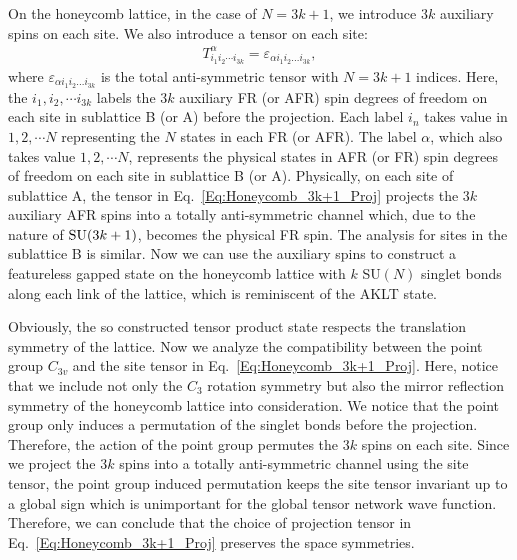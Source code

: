 \documentclass[aps,prb,twocolumn,superscriptaddress,showpacs]{revtex4}
\newcommand{\SU}{\mathrm{SU}}
\newcommand{\beqn}{\begin{eqnarray}}
\newcommand{\eeqn}{\end{eqnarray}}
\def\SU{{\rm SU}}
\begin{document}
On the honeycomb lattice, in the case of $N = 3k+1$, we introduce
$3k$ auxiliary spins on each site. We also introduce a tensor on
each site: \beqn T^{\alpha}_{i_1 i_2 \cdots i_{3k}} =
\varepsilon_{\alpha i_1 i_2 ... i_{3k}},
\label{Eq:Honeycomb_3k+1_Proj}\eeqn where $\varepsilon_{\alpha i_1
i_2 ... i_{3k}}$ is the total anti-symmetric tensor with $N=3k+1$
indices. Here, the $i_1, i_2, \cdots i_{3k}$ labels the $3k$
auxiliary FR (or AFR) spin degrees of freedom on each site in
sublattice B (or A) before the projection. Each label $i_n$ takes
value in $1,2, \cdots N$ representing the $N$ states in each FR
(or AFR). The label $\alpha$, which also takes value $1,2, \cdots
N$, represents the physical states in AFR (or FR) spin degrees of
freedom on each site in sublattice B (or A). Physically, on each
site of sublattice A, the tensor in
Eq.~\ref{Eq:Honeycomb_3k+1_Proj} projects the $3k$ auxiliary AFR
spins into a totally anti-symmetric channel which, due to the
nature of $\SU(3k+1)$, becomes the physical FR spin. The analysis
for sites in the sublattice B is similar. Now we can use the
auxiliary spins to construct a featureless gapped state on the
honeycomb lattice with $k$ SU$(N)$ singlet bonds along each link
of the lattice, which is reminiscent of the AKLT state.


Obviously, the so constructed tensor product state respects the
translation symmetry of the lattice. Now we analyze the
compatibility between the point group $C_{3v}$ and the site tensor
in Eq.~\ref{Eq:Honeycomb_3k+1_Proj}. Here, notice that we include
not only the $C_3$ rotation symmetry but also the mirror
reflection symmetry of the honeycomb lattice into consideration.
We notice that the point group only induces a permutation of the
singlet bonds before the projection. Therefore, the action of the
point group permutes the $3k$ spins on each site. Since we project
the $3k$ spins into a totally anti-symmetric channel using the
site tensor, the point group induced permutation keeps the site
tensor invariant up to a global sign which is unimportant for the
global tensor network wave function. Therefore, we can conclude
that the choice of projection tensor in
Eq.~\ref{Eq:Honeycomb_3k+1_Proj} preserves the space symmetries.
\end{document}
